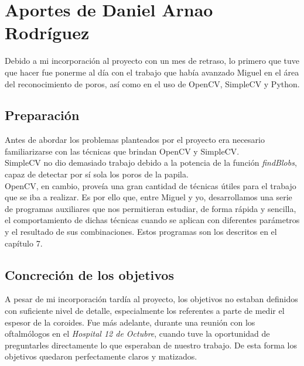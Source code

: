 \section{Aportes de  Daniel Arnao Rodríguez}
Debido a mi incorporación al proyecto con un mes de retraso, lo primero 
que tuve que hacer fue ponerme al día con el trabajo que había avanzado 
Miguel en el área del reconocimiento de poros, así como en el uso de 
OpenCV, SimpleCV y Python.

\subsection{Preparación}
Antes de abordar los problemas planteados por el proyecto era necesario
familiarizarse con las técnicas que brindan OpenCV y SimpleCV. \\
SimpleCV no dio demasiado trabajo debido a la potencia de la función
\emph{findBlobs}, capaz de detectar por sí sola los poros de la papila. \\
OpenCV, en cambio, proveía una gran cantidad de técnicas útiles para el
trabajo que se iba a realizar. Es por ello que, entre Miguel y yo,
desarrollamos una serie de programas auxiliares que nos permitieran
estudiar, de forma rápida y sencilla, el comportamiento de dichas 
técnicas cuando se aplican con diferentes parámetros y el resultado
de sus combinaciones. Estos programas son los descritos en el capítulo 7.

\subsection{Concreción de los objetivos}
A pesar de mi incorporación tardía al proyecto, los objetivos no estaban
definidos con suficiente nivel de detalle, especialmente los referentes
a parte de medir el espesor de la coroides. Fue más adelante, durante 
una reunión con los oftalmólogos en el \emph{Hospital 12 de Octubre},
cuando tuve la oportunidad de preguntarles directamente lo que esperaban
de nuestro trabajo. De esta forma los objetivos quedaron perfectamente
claros y matizados.

